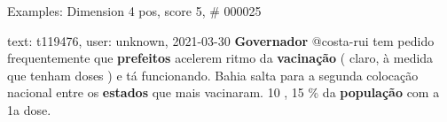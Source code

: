 \begin{frame}{Examples: Dimension 4 pos, score 5, \# 000025}
\footnotesize
\begin{exampleblock}{text: t119476, user: unknown, 2021-03-30}
\textbf{Governador} @costa-rui tem pedido frequentemente que \textbf{prefeitos} 
acelerem ritmo da \textbf{vacinação} ( claro, à medida que tenham doses ) e tá 
funcionando. Bahia salta para a segunda colocação nacional entre os 
\textbf{estados} que mais vacinaram. 10 , 15 \% da \textbf{população} com a 1a 
dose. 
\end{exampleblock}
\end{frame}
